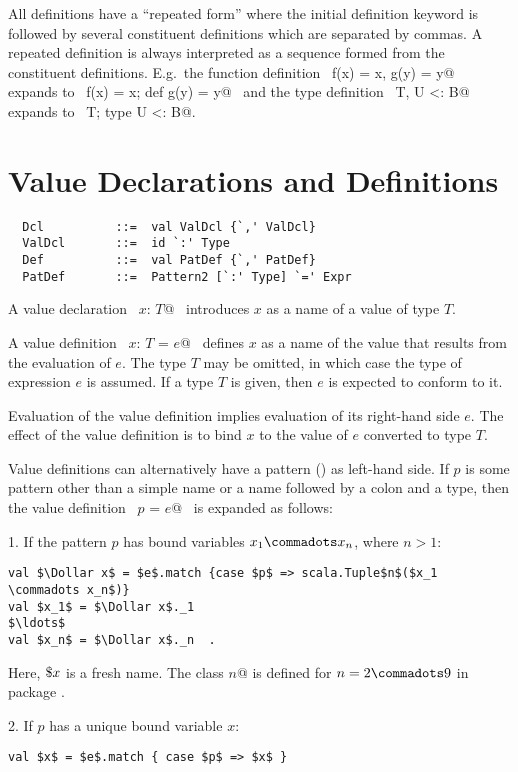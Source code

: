 \documentclass[a4paper,12pt,twoside,titlepage]{book}
\begin{document}
All definitions have a ``repeated form'' where the initial
definition keyword is followed by several constituent definitions
which are separated by commas.  A repeated definition is
always interpreted as a sequence formed from the
constituent definitions. E.g.\ the function definition
~\lstinline@def f(x) = x, g(y) = y@~ expands to
~\lstinline@def f(x) = x; def g(y) = y@~ and
the type definition
~\lstinline@type T, U <: B@~ expands to
~\lstinline@type T; type U <: B@.

\section{Value Declarations and Definitions}
\label{sec:valdef}

\syntax\begin{lstlisting}
  Dcl          ::=  val ValDcl {`,' ValDcl}
  ValDcl       ::=  id `:' Type
  Def          ::=  val PatDef {`,' PatDef}
  PatDef       ::=  Pattern2 [`:' Type] `=' Expr
\end{lstlisting}

A value declaration ~\lstinline@val $x$: $T$@~ introduces $x$ as a name of a value of
type $T$.  

A value definition ~\lstinline@val $x$: $T$ = $e$@~ defines $x$ as a name of the
value that results from the evaluation of $e$. The type $T$ may be
omitted, in which case the type of expression $e$ is assumed.
If a type $T$ is given, then $e$ is expected to conform to it.

Evaluation of the value definition implies evaluation of its
right-hand side $e$.  The effect of the value definition is to bind
$x$ to the value of $e$ converted to type $T$.

Value definitions can alternatively have a pattern
() as left-hand side.  If $p$ is some pattern other
than a simple name or a name followed by a colon and a type, then the
value definition ~\lstinline@val $p$ = $e$@~ is expanded as follows:

1. If the pattern $p$ has bound variables $x_1 \commadots x_n$, where $n > 1$:
\begin{lstlisting}
val $\Dollar x$ = $e$.match {case $p$ => scala.Tuple$n$($x_1 \commadots x_n$)}
val $x_1$ = $\Dollar x$._1
$\ldots$
val $x_n$ = $\Dollar x$._n  .
\end{lstlisting}
Here, $\mbox{\$} x$ is a fresh name.  The class
\lstinline@Tuple$n$@ is defined for $n = 2 \commadots 9$ in package
.

2. If $p$ has a unique bound variable $x$:
\begin{lstlisting}
val $x$ = $e$.match { case $p$ => $x$ }
\end{lstlisting}
\end{document}
